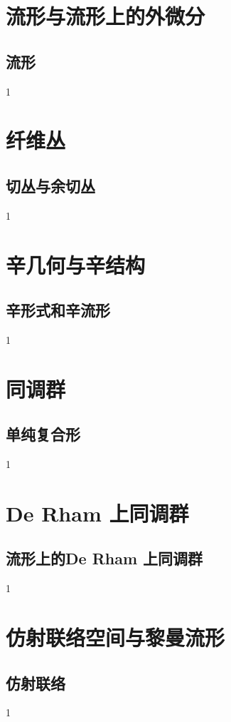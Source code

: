 \section{流形与流形上的外微分}
\subsection{流形}
1
\section{纤维丛}
\subsection{切丛与余切丛}
1
\section{辛几何与辛结构}
\subsection{辛形式和辛流形}
1
\section{同调群}
\subsection{单纯复合形}
1
\section{De Rham 上同调群}
\subsection{流形上的De Rham 上同调群}
1
\section{仿射联络空间与黎曼流形}
\subsection{仿射联络}
1















